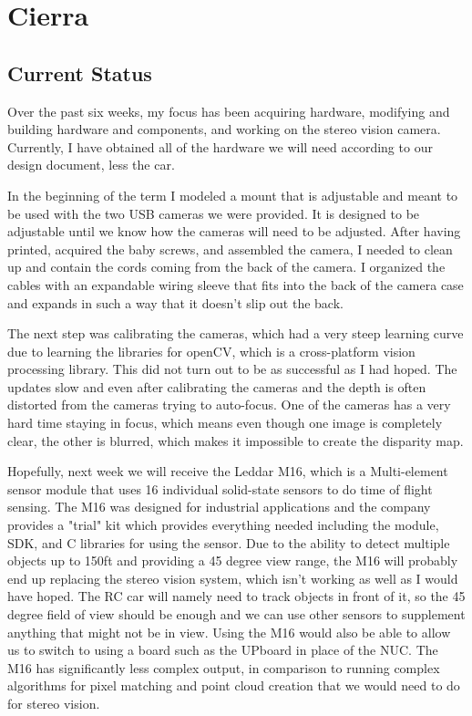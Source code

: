 \documentclass[compsoc,draftclsnofoot,onecolumn,10pt]{IEEEtran}
\begin{document}
\section{Cierra}
	\subsection{Current Status}
		Over the past six weeks, my focus has been acquiring hardware, modifying and building hardware and components, and working on the stereo vision camera. 
		Currently, I have obtained all of the hardware we will need according to our design document, less the car. 
		
		In the beginning of the term I modeled a mount that is adjustable and meant to be used with the two USB cameras we were provided. 
		It is designed to be adjustable until we know how the cameras will need to be adjusted. 
		After having printed, acquired the baby screws, and assembled the camera, I needed to clean up and contain the cords coming from the back of the camera. 
		I organized the cables with an expandable wiring sleeve that fits into the back of the camera case and expands in such a way that it doesn't slip out the back. 
		
		The next step was calibrating the cameras, which had a very steep learning curve due to learning the libraries for openCV, which is a cross-platform vision processing library. 
		This did not turn out to be as successful as I had hoped.
		The updates slow and even after calibrating the cameras and the depth is often distorted from the cameras trying to auto-focus. 
		One of the cameras has a very hard time staying in focus, which means even though one image is completely clear, the other is blurred, which makes it impossible to create the disparity map.
		
		Hopefully, next week we will receive the Leddar M16, which is a Multi-element sensor module that uses 16 individual solid-state sensors to do time of flight sensing. 
		The M16 was designed for industrial applications and the company provides a "trial" kit which provides everything needed including the module, SDK, and C libraries for using the sensor.
		Due to the ability to detect multiple objects up to 150ft and providing a 45 degree view range, the M16 will probably end up replacing the stereo vision system, which isn't working as well as I would have hoped. 
		The RC car will namely need to track objects in front of it, so the 45 degree field of view should be enough and we can use other sensors to supplement anything that might not be in view.
		Using the M16 would also be able to allow us to switch to using a board such as the UPboard in place of the NUC.
		The M16 has significantly less complex output, in comparison to running complex algorithms for pixel matching and point cloud creation that we would need to do for stereo vision. 
		
\end{document}
